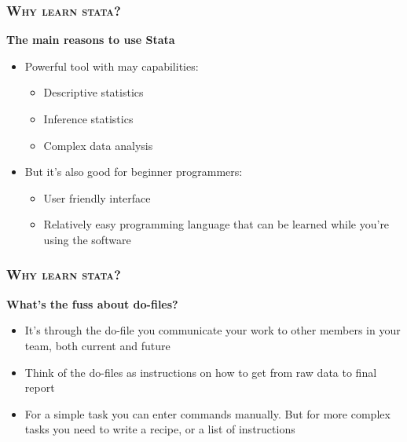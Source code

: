 \documentclass[10pt]{beamer}
\begin{document}
		\begin{frame}
			\frametitle{\textsc{Why learn stata?}}
			\begin{center}
				\Large\textbf{The main reasons to use Stata}
			\end{center}
			\begin{itemize}
				\item Powerful tool with may capabilities:
				
				\begin{itemize}
					\item Descriptive statistics
					
					\item Inference statistics
					
					\item Complex data analysis
					
				\end{itemize}
				
				\item But it’s also good for beginner programmers:
				
				\begin{itemize}
					\item User friendly interface
					
					\item Relatively easy programming language that can be learned while you’re using the software
					
				\end{itemize}
			\end{itemize}
		\end{frame}	

		\begin{frame}
			\frametitle{\textsc{Why learn stata?}}
			\begin{center}
				\Large\textbf{What's the fuss about do-files?}
			\end{center}
			\begin{itemize}
				\item It’s through the do-file you communicate your work to other members in your team, both current and future
				\item Think of the do-files as instructions on how to get from raw data to final report
				\item For a simple task you can enter commands manually. But for more complex tasks you need to write a recipe, or a list of instructions
				
				\end{itemize}
			\end{frame}
		
\end{document}
